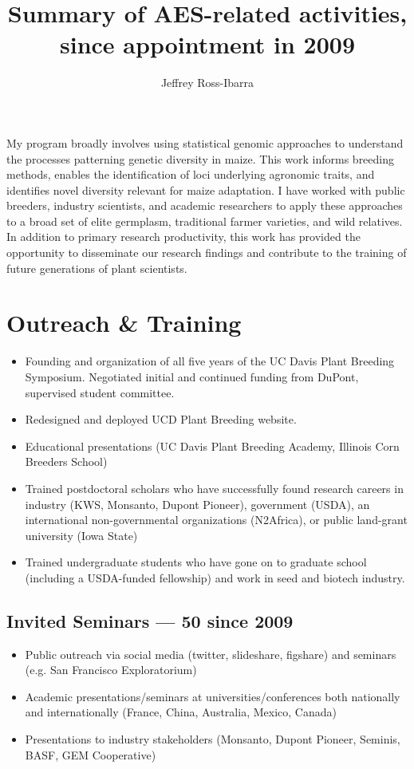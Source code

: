 \documentclass[]{article}
\begin{document}
\title{Summary of AES-related activities, since appointment in 2009}
\author{Jeffrey Ross-Ibarra}
\date{}
\maketitle

My program broadly involves using statistical genomic approaches to understand the processes patterning genetic diversity in maize.  This work informs breeding methods, enables the identification of loci underlying agronomic traits, and identifies novel diversity relevant for maize adaptation.  I have worked with public breeders, industry scientists, and academic researchers to apply these approaches to a broad set of elite germplasm, traditional farmer varieties, and wild relatives.  In addition to primary research productivity, this work has provided the opportunity to disseminate our research findings and contribute to the training of future generations of plant scientists.

\section*{Outreach \& Training}
\begin{itemize}
\item Founding and organization of all five years of the UC Davis Plant Breeding Symposium. Negotiated initial and continued funding from DuPont, supervised student committee.
\item Redesigned and deployed UCD Plant Breeding website.
\item Educational presentations (UC Davis Plant Breeding Academy, Illinois Corn Breeders School)
\item Trained postdoctoral scholars who have successfully found research careers in industry (KWS, Monsanto, Dupont Pioneer), government (USDA), an international non-governmental organizations (N2Africa), or public land-grant university (Iowa State)
\item Trained undergraduate students who have gone on to graduate school (including a USDA-funded fellowship) and work in seed and biotech industry.
\end{itemize}

\subsection*{Invited Seminars --- 50 since 2009}
\begin{itemize}
\item Public outreach via social media (twitter, slideshare, figshare) and seminars (e.g. San Francisco Exploratorium)
\item Academic presentations/seminars at universities/conferences both nationally and internationally (France, China, Australia, Mexico, Canada)
\item Presentations to industry stakeholders (Monsanto, Dupont Pioneer, Seminis, BASF, GEM Cooperative)
\end{itemize}
\end{document}
